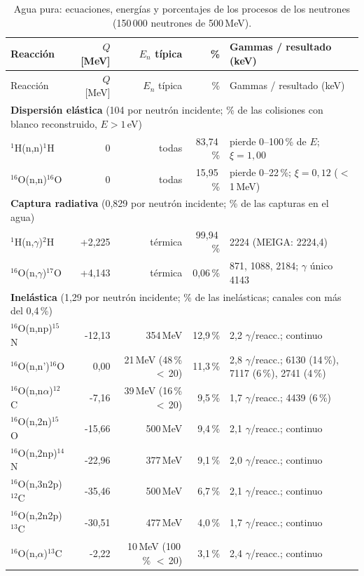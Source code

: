 \documentclass[11pt,a4paper]{article}
\begin{document}
{\footnotesize\begin{longtable}{p{4.4cm}rrrp{4.6cm}}
\caption{Agua pura: ecuaciones, energías y porcentajes de los procesos de los neutrones (150\,000 neutrones de 500\,MeV).}\label{tab:procesos_pura}\\\toprule
Reacción & $Q$ [MeV] & $E_n$ típica & \% & Gammas / resultado (keV) \\\midrule\endfirsthead
\toprule Reacción & $Q$ [MeV] & $E_n$ típica & \% & Gammas / resultado (keV) \\\midrule\endhead
\multicolumn{5}{l}{\textbf{Dispersión elástica} (104 por neutrón incidente; \% de las colisiones con blanco reconstruido, $E>1$\,eV)}\\
$^1$H(n,n)$^1$H & 0 & todas & 83,74\,\% & pierde 0--100\,\% de $E$; $\xi = 1{,}00$ \\
$^{16}$O(n,n)$^{16}$O & 0 & todas & 15,95\,\% & pierde 0--22\,\%; $\xi = 0{,}12$ ($<$\,1\,MeV) \\
\midrule\multicolumn{5}{l}{\textbf{Captura radiativa} (0,829 por neutrón incidente; \% de las capturas en el agua)}\\
$^1$H(n,$\gamma$)$^2$H & +2,225 & térmica & 99,94\,\% & 2224 (MEIGA: 2224,4) \\
$^{16}$O(n,$\gamma$)$^{17}$O & +4,143 & térmica & 0,06\,\% & 871, 1088, 2184; $\gamma$ único 4143 \\
\midrule\multicolumn{5}{l}{\textbf{Inelástica} (1,29 por neutrón incidente; \% de las inelásticas; canales con más del 0,4\,\%)}\\
$^{16}$O(n,np)$^{15}$N & -12,13 & 354\,MeV & 12,9\,\% & 2,2 $\gamma$/reacc.; continuo \\
$^{16}$O(n,n')$^{16}$O & 0,00 & 21\,MeV (48\,\% $<$\,20) & 11,3\,\% & 2,8 $\gamma$/reacc.; 6130 (14\,\%), 7117 (6\,\%), 2741 (4\,\%) \\
$^{16}$O(n,n$\alpha$)$^{12}$C & -7,16 & 39\,MeV (16\,\% $<$\,20) & 9,5\,\% & 1,7 $\gamma$/reacc.; 4439 (6\,\%) \\
$^{16}$O(n,2n)$^{15}$O & -15,66 & 500\,MeV & 9,4\,\% & 2,1 $\gamma$/reacc.; continuo \\
$^{16}$O(n,2np)$^{14}$N & -22,96 & 377\,MeV & 9,1\,\% & 2,0 $\gamma$/reacc.; continuo \\
$^{16}$O(n,3n2p)$^{12}$C & -35,46 & 500\,MeV & 6,7\,\% & 2,1 $\gamma$/reacc.; continuo \\
$^{16}$O(n,2n2p)$^{13}$C & -30,51 & 477\,MeV & 4,0\,\% & 1,7 $\gamma$/reacc.; continuo \\
$^{16}$O(n,$\alpha$)$^{13}$C & -2,22 & 10\,MeV (100\,\% $<$\,20) & 3,1\,\% & 2,4 $\gamma$/reacc.; continuo \\

\end{longtable}}
\end{document}
